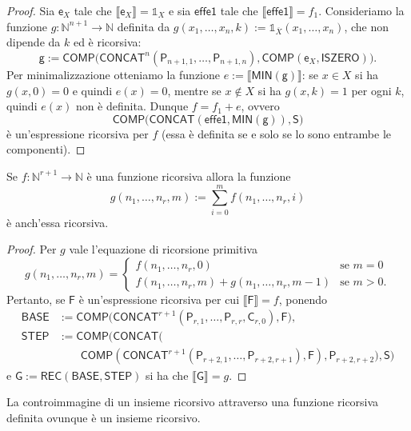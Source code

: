 \begin{proof}
Sia $\mathsf e_X$ tale che $\llbracket\mathsf e_X\rrbracket=\mathbb 1_X$ e sia $\mathsf{effe1}$ tale che $\llbracket\mathsf{effe1}\rrbracket=f_1$.
Consideriamo la funzione $g\colon\mathbb N^{n+1}\to\mathbb N$ definita da $g(x_1,\dots,x_n,k):=\mathbb 1_{\overline X}(x_1,\dots,x_n)$, che non dipende da $k$ ed è ricorsiva:
\[
\mathsf g:=\mathsf{COMP}\bigl(\mathsf{CONCAT}^n(\mathsf P_{n+1,1},\dots,\mathsf P_{n+1,n}),\mathsf{COMP}(\mathsf e_X,\mathsf{ISZERO})\bigr).
\]
Per minimalizzazione otteniamo la funzione $e:=\llbracket\mathsf{MIN}(\mathsf g)\rrbracket$: se $x\in X$ si ha $g(x,0)=0$ e quindi $e(x)=0$, mentre se $x\notin X$ si ha $g(x,k)=1$ per ogni $k$, quindi $e(x)$ non è definita. Dunque $f=f_1+e$, ovvero
\[
\mathsf{COMP}\bigl(\mathsf{CONCAT}(\mathsf{effe1},\mathsf{MIN}(\mathsf g)),\mathsf S\bigr)
\]
è un'espressione ricorsiva per $f$ (essa è definita se e solo se lo sono entrambe le componenti).
\end{proof}

\begin{lemm}
Se $f\colon\mathbb N^{r+1}\to\mathbb N$ è una funzione ricorsiva allora la funzione
\[
g(n_1,\dots,n_r,m):=\sum_{i=0}^m f(n_1,\dots,n_r,i)
\]
è anch'essa ricorsiva.
\end{lemm}

\begin{proof}
Per $g$ vale l'equazione di ricorsione primitiva
\[
g(n_1,\dots,n_r,m)=\begin{cases}
f(n_1,\dots,n_r,0) & \text{se } m=0\\
f(n_1,\dots,n_r,m)+g(n_1,\dots,n_r,m-1) & \text{se } m>0.
\end{cases}
\]
Pertanto, se $\mathsf F$ è un'espressione ricorsiva per cui $\llbracket\mathsf F\rrbracket=f$, ponendo
\begin{align*}
\mathsf{BASE}&:=\mathsf{COMP}\bigl(\mathsf{CONCAT}^{r+1}(\mathsf P_{r,1},\dots,\mathsf P_{r,r},\mathsf C_{r,0}),\mathsf F\bigr),\\
\mathsf{STEP}&:=\mathsf{COMP}\bigl(\mathsf{CONCAT}(\\&\qquad\mathsf{COMP}(\mathsf{CONCAT}^{r+1}(\mathsf P_{r+2,1},\dots,\mathsf P_{r+2,r+1}),\mathsf F),\mathsf P_{r+2,r+2}),\mathsf S\bigr)
\end{align*}
e $\mathsf G:=\mathsf{REC}(\mathsf{BASE},\mathsf{STEP})$ si ha che $\llbracket\mathsf G\rrbracket=g$.
\end{proof}

\begin{lemm}
La controimmagine di un insieme ricorsivo attraverso una funzione ricorsiva definita ovunque è un insieme ricorsivo.
\end{lemm}

